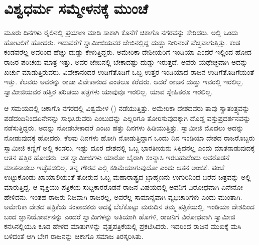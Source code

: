 
\chapter{ವಿಶ್ವಧರ್ಮ ಸಮ್ಮೇಳನಕ್ಕೆ ಮುಂಚೆ}

 ಮೂರು ದಿನಗಳು ರೈಲಿನಲ್ಲಿ ಪ್ರಯಾಣ ಮಾಡಿ ಸಾಕಾಗಿ ಕೊನೆಗೆ ಚಿಕಾಗೊ ನಗರವನ್ನು ಸೇರಿದರು. ಅಲ್ಲಿ ಒಂದು ಹೋಟಲಿಗೆ ಹೋದರು. ಇದುವರೆಗೆ ಸ್ವಾಮೀಜಿಯವರ ಜೇಬಿನಲ್ಲಿದ್ದ ದುಡ್ಡು ನೀರಿನಂತೆ ವೆಚ್ಚವಾಗುತ್ತಿತ್ತು. ಕಂಡ ಕಂಡವರೆಲ್ಲ ಅವರಿಂದ ಹೆಚ್ಚು ದುಡ್ಡು ಕೇಳುತ್ತಿದ್ದರು. ಅಮೇರಿಕಾ ದೇಶೀಯರಿಗೆ ಇಂಡಿಯಾ ಎಂದರೆ ಇಲ್ಲಿಂದ ಹೋದ ರಾಜರ ಪರಿಚಯ ಮಾತ್ರ ಇತ್ತು. ಅವರ ಜೇಬಿನಲ್ಲಿ ಬೇಕಾದಷ್ಟು ದುಡ್ಡು ಇರುತ್ತದೆ. ಅವರು ಯಥೇಚ್ಛವಾಗಿ ಅದನ್ನು ಖರ್ಚು ಮಾಡುತ್ತಿರುವರು. ವಿವೇಕಾನಂದರ ಉಡಿಗೆತೊಡಿಗೆ ಒಬ್ಬ ಉತ್ತರ ಇಂಡಿಯಾದ ರಾಜನ ಉಡಿಗೆತೊಡಿಗೆಯಂತೆ ಇತ್ತು. ಕೆಲವರು ಅವರನ್ನು ರಾಜಾ ವಿವೇಕಾನಂದ ಎಂತಲೂ ಕರೆದರು. ಆದರೆ ರಾಜನ ದುಡ್ಡು ಇವರಲ್ಲಿ ಇರಲಿಲ್ಲ. ಸ್ವಾಮೀಜಿಯವರ ಹತ್ತಿರ ಪರಿಚಯ ಪತ್ರಗಳು ಯಾವುವೂ ಇರಲಿಲ್ಲ. ಯಾವ ಸ್ನೇಹಿತರೂ ಇರಲಿಲ್ಲ. 

 ಆ ಸಮಯದಲ್ಲಿ ಚಿಕಾಗೊ ನಗರದಲ್ಲಿ ವಿಶ್ವಮೇಳ () ನಡೆಯುತ್ತಿತ್ತು. ಅಮೇರಿಕಾ ದೇಶದವರು ತಾವು ಸ್ವಾತಂತ್ರ್ಯವನ್ನು ಪಡೆದಂದಿನಿಂದ\break ಏನೇನನ್ನು ಸಾಧಿಸಿರುವರು ಎಂಬುದನ್ನು ಎಲ್ಲರಿಗೂ ತೋರಿಸುವುದಕ್ಕಾಗಿ ದೊಡ್ಡ ವಸ್ತುಪ್ರದರ್ಶನವನ್ನು ನಡೆಸುತ್ತಿದ್ದರು. ಅದನ್ನು ನೋಡಬೇಕಾದರೆ ಎಂಟು ಹತ್ತು ದಿನಗಳು ಹಿಡಿಯುತ್ತಿತ್ತು. ಸ್ವಾಮೀಜಿ ಮೊದಲು ಅದನ್ನು ನೋಡುವುದಕ್ಕೆ ಹೋದರು. ಕೆಲವು ದಿನಗಳು ಹೋಗಿ ನೋಡುತ್ತಿದ್ದಾಗ ಒಂದು ದಿನ ಇಂಡಿಯಾ ದೇಶದ ರಾಜರೊಬ್ಬರು ಸ್ವಾಮೀಜಿ ಕಣ್ಣಿಗೆ ಅಲ್ಲಿ ಕಂಡರು. ಇಷ್ಟು ದೂರ ದೇಶದಲ್ಲಿ ಒಬ್ಬ ಭಾರತೀಯನು ಸಿಕ್ಕಿದನಲ್ಲ ಎಂದು ಮಾತನಾಡುವುದಕ್ಕೆ ಆತನ ಹತ್ತಿರ ಹೋದರು. ಆತ ಸ್ವಾಮೀಜಿಗಳು ಯಾರೋ ಬೈರಾಗಿ ಸಂನ್ಯಾಸಿ ಇರಬಹುದೆಂದು ಅವರೊಡನೆ ಮಾತನಾಡಲು ಇಚ್ಛೆಪಡಲಿಲ್ಲ. ತನ್ನ ಗೌರವ ಎಲ್ಲಿ ಕಡಿಮೆಯಾಗುವುದೋ ಎಂದು ಆತನ ಅಂಜಿಕೆ. ಪಂಚೆ ಉಟ್ಟುಕೊಂಡು ಖಾಯಾಲಿಯಂತೆ ತೋರುವ ಒಬ್ಬ ಮಹಾರಾಷ್ಟ್ರದ ಬ್ರಾಹ್ಮಣನು ಉಗುರಿನಿಂದ ಬರೆದ ಚಿತ್ರವನ್ನು ಅಲ್ಲಿ ಮಾರುತ್ತಿದ್ದ. ಆ ವ್ಯಕ್ತಿಯು ಪತ್ರಿಕೆಯ ಸುದ್ದಿಕಾರರೊಡನೆ ರಾಜನ ವಿಷಯದಲ್ಲಿ ಅವನಿಗೆ ವಿರೋಧವಾಗಿ ಏನೇನೋ ಹೇಳಿದನು. ಇಂತಹ ರಾಜರು ನಿಜವಾಗಿ ರಾಜರಲ್ಲ, ಅವರೆಲ್ಲ ಸಾಮಾನ್ಯವಾಗಿ ವ್ಯಭಿಚಾರಿಗಳು ಎಂದು ಮುಂತಾಗಿ. ಅಮೇರಿಕಾ ದೇಶದ ಪತ್ರಿಕೆಯ ಸಂಪಾದಕರು ಅದಕ್ಕೆ ಬೆಲೆಕೊಟ್ಟು ಮರುದಿನ ತಮ್ಮ ಪತ್ರಿಕೆಯಲ್ಲಿ, ಇಂಡಿಯಾ ದೇಶದಿಂದ ಬಂದ ಜ್ಞಾನಿಯೋರ್ವನನ್ನು ಎಂದರೆ ಸ್ವಾಮಿಗಳನ್ನು ಅತಿಯಾಗಿ ಹೊಗಳಿ, ರಾಜನಿಗೆ ವಿರೋಧವಾಗಿ ಸ್ವಾಮೀಜಿ ಕನಸಿನಲ್ಲಿಯೂ ಕೂಡ ಹೇಳದ ಮಾತುಗಳನ್ನು ವೃತ್ತಪತ್ರಿಕೆಯಲ್ಲಿ ಪ್ರಕಟಿಸಿದರು. ಇದರಿಂದ ರಾಜನ ಮುಖಕ್ಕೆ ಮಸಿ ಬಳಿದಂತೆ ಆಗಿ ಬೇಗ ರಾಜನನ್ನು ಚಿಕಾಗೊ ಸಮಾಜ ತಿರಸ್ಕರಿಸಿತು. 

